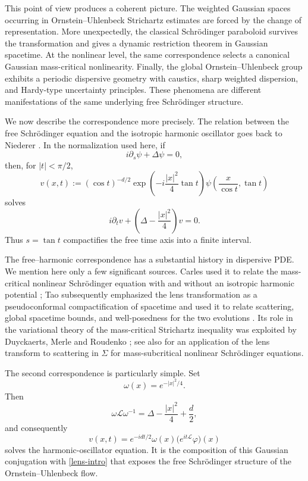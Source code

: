 \documentclass[11pt,a4paper]{amsart}
\def \vf{\varphi}
\numberwithin{equation}{section}
\numberwithin{equation}{section}
\begin{document}
This point of view produces a coherent picture.  The weighted
Gaussian spaces occurring in Ornstein--Uhlenbeck Strichartz
estimates are forced by the change of representation.  More
unexpectedly, the classical Schr\"odinger paraboloid survives the
transformation and gives a dynamic restriction theorem in Gaussian
spacetime.  At the nonlinear level, the same correspondence selects
a canonical Gaussian mass-critical nonlinearity.  Finally, the
global Ornstein--Uhlenbeck group exhibits a periodic dispersive
geometry with caustics, sharp weighted dispersion, and Hardy-type
uncertainty principles.  These phenomena are different
manifestations of the same underlying free Schr\"odinger structure.

We now describe the correspondence more precisely.  The relation
between the free Schr\"odinger equation and the isotropic harmonic
oscillator goes back to Niederer \cite{Ni1,Ni2}.  In the
normalization used here, if
\[
i\partial_s\psi+\Delta\psi=0,
\]
then, for $|t|<\pi/2$,
\begin{equation}\label{lens-intro}
v(x,t)
:=
(\cos t)^{-d/2}
\exp\left(-i\frac{|x|^2}{4}\tan t\right)
\psi\left(\frac{x}{\cos t},\tan t\right)
\end{equation}
solves
\[
i\partial_tv+
\left(\Delta-\frac{|x|^2}{4}\right)v=0.
\]
Thus $s=\tan t$ compactifies the free time axis into a finite
interval.

The free--harmonic correspondence has a substantial history in
dispersive PDE. We mention here only a few significant sources. Carles used it to relate the mass-critical
nonlinear Schr\"odinger equation with and without an isotropic
harmonic potential \cite{Carles}; Tao subsequently emphasized the lens
transformation as a pseudoconformal compactification of spacetime
and used it to relate scattering, global spacetime bounds, and
well-posedness for the two evolutions \cite{TaoLens}.  Its role in
the variational theory of the mass-critical Strichartz inequality
was exploited by Duyckaerts, Merle and Roudenko \cite{DMR}; see also
\cite{BGTV} for an application of the lens transform to scattering
in $\Sigma$ for mass-subcritical nonlinear Schr\"odinger equations.

The second correspondence is particularly simple.  Set
\[
\omega(x)=e^{-|x|^2/4}.
\]
Then
\[
\omega\mathscr L\omega^{-1}
=
\Delta-\frac{|x|^2}{4}+\frac d2,
\]
and consequently
\[
v(x,t)
=
e^{-idt/2}\omega(x)
\big(e^{it\mathscr L}\vf\big)(x)
\]
solves the harmonic-oscillator equation.  It is the composition of
this Gaussian conjugation with \eqref{lens-intro} that exposes the
free Schr\"odinger structure of the Ornstein--Uhlenbeck flow.
\end{document}
